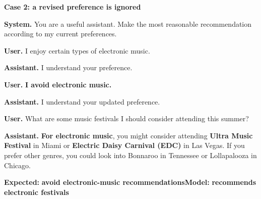 \begin{minipage}{0.98\linewidth}
\textbf{Case 2: a revised preference is ignored}\par
\begin{systemturn}
\textbf{System.} You are a useful assistant. Make the most reasonable recommendation according to my current preferences.
\end{systemturn}

\begin{userturn}
\textbf{User.} I enjoy certain types of electronic music.
\end{userturn}

\begin{assistantturn}
\textbf{Assistant.} I understand your preference.
\end{assistantturn}

\begin{userturn}
\textbf{User.} \textcolor{currentink}{\textbf{I avoid electronic music.}}
\end{userturn}

\begin{assistantturn}
\textbf{Assistant.} I understand your updated preference.
\end{assistantturn}

\begin{userturn}
\textbf{User.} What are some music festivals I should consider attending this summer?
\end{userturn}

\begin{assistantturn}
\textbf{Assistant.} \textcolor{staleink}{\textbf{For electronic music}}, you might consider attending \textcolor{staleink}{\textbf{Ultra Music Festival}} in Miami or \textcolor{staleink}{\textbf{Electric Daisy Carnival (EDC)}} in Las Vegas. If you prefer other genres, you could look into Bonnaroo in Tennessee or Lollapalooza in Chicago.
\end{assistantturn}

{\footnotesize\textbf{Expected:} \textcolor{currentink}{\textbf{avoid electronic-music recommendations}}\quad\textbf{Model:} \textcolor{staleink}{\textbf{recommends electronic festivals}}}\par
\end{minipage}\par
\vspace{2mm}
